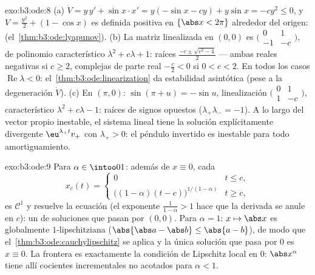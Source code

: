 \begin{solution}{exo:b3:ode:8}
(a) $\dot V = y\,y' + \sin x\cdot x' = y(-\sin x - cy) +
y\sin x = -cy^2 \leq 0$, y $V = \frac{y^2}2 + (1 - \cos x)$ es definida
positiva en $\{\abs x < 2\pi\}$ alrededor del origen:
 (el~\cref{thm:b3:ode:lyapunov}).
(b) La matriz linealizada en $(0,0)$ es
$\bigl(\begin{smallmatrix}0 & 1\\ -1 &
-c\end{smallmatrix}\bigr)$, de polinomio característico
$\lambda^2 + c\lambda + 1$: raíces $\frac{-c \pm \sqrt{c^2 -
4}}2$ --- ambas reales negativas si $c \geq 2$, complejas de parte real
$-\frac c2 < 0$ si $0 < c < 2$. En todos los casos
$\operatorname{Re}\lambda < 0$:
el~\cref{thm:b3:ode:linearization} da estabilidad asintótica (pese a la
degeneración $\dot V$). (c) En $(\pi, 0)$: $\sin(\pi + u) = -\sin u$,
linealización
$\bigl(\begin{smallmatrix}0&1\\1&-c\end{smallmatrix}\bigr)$,
característico $\lambda^2 + c\lambda - 1$: raíces de signos opuestos
($\lambda_+\lambda_- = -1$). A lo largo del vector propio inestable, el
sistema lineal tiene la solución explícitamente divergente
$\eu^{\lambda_+t}v_+$ con $\lambda_+ > 0$: el péndulo invertido es
inestable para todo amortiguamiento.
\end{solution}

\begin{solution}{exo:b3:ode:9}
Para $\alpha \in \intoo01$: además de $x \equiv 0$, cada
\[
x_c(t) = \begin{cases}0 & t \leq c,\\
\bigl((1-\alpha)(t - c)\bigr)^{1/(1-\alpha)} & t \geq c,
\end{cases}
\]
es $\mathcal C^1$ y resuelve la ecuación (el exponente
$\frac1{1-\alpha} > 1$ hace que la derivada se anule en $c$): un
 de soluciones que pasan por $(0,0)$. Para $\alpha = 1$: $x
\mapsto \abs x$ es globalmente $1$-lipschitziana
($\abs{\abs a - \abs b} \leq \abs{a - b}$), de modo que
el~\cref{thm:b3:ode:cauchylipschitz} se aplica y la única solución que
pasa por $0$ es $x \equiv 0$. La frontera es exactamente la condición de
Lipschitz local en $0$: $\abs x^\alpha$ tiene allí cocientes
incrementales no acotados para $\alpha < 1$.
\end{solution}

